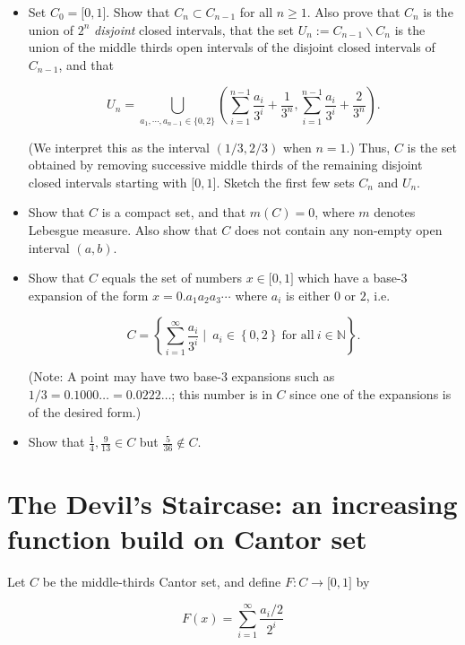 \documentclass{qlnotes-export}
\begin{document}
\begin{itemize}
\item
  Set \(C_{0} = \lbrack 0,1\rbrack\). Show that \(C_{n} \subset C_{n - 1}\) for all \(n \geq 1\). Also prove that \(C_{n}\) is the union of \(2^{n}\) \emph{disjoint} closed intervals, that the set \(U_{n} := C_{n - 1}\backslash C_{n}\) is the union of the middle thirds open intervals of the disjoint closed intervals of \(C_{n - 1}\), and that

  \[U_{n} = \bigcup\limits_{a_{1},\cdots,a_{n - 1} \in {\{{0,2}\}}}(\sum\limits_{i = 1}^{n - 1}\frac{a_{i}}{3^{i}} + \frac{1}{3^{n}},\sum\limits_{i = 1}^{n - 1}\frac{a_{i}}{3^{i}} + \frac{2}{3^{n}}).\]

  (We interpret this as the interval \((1/3,2/3)\) when \(n = 1\).) Thus, \(C\) is the set obtained by removing successive middle thirds of the remaining disjoint closed intervals starting with \(\lbrack 0,1\rbrack\). Sketch the first few sets \(C_{n}\) and \(U_{n}\).
\item
  Show that \(C\) is a compact set, and that \(m(C) = 0\), where \(m\) denotes Lebesgue measure. Also show that \(C\) does not contain any non-empty open interval \((a,b)\).
\item
  Show that \(C\) equals the set of numbers \(x \in \lbrack 0,1\rbrack\) which have a base-3 expansion of the form \(x = 0.a_{1}a_{2}a_{3}\cdots\) where \(a_{i}\) is either \(0\) or \(2\), i.e.~

  \[C = \left\{ {\sum\limits_{i = 1}^{\infty}\frac{a_{i}}{3^{i}} \mid \ a_{i} \in \left\{ {0,2} \right\}\ \text{for all}\ i \in {\mathbb{N}}} \right\}.\]

  (Note: A point may have two base-3 expansions such as \(1/3 = 0.1000\ldots = 0.0222\ldots\); this number is in \(C\) since one of the expansions is of the desired form.)
\item
  Show that \(\frac{1}{4},\frac{9}{13} \in C\) but \(\frac{5}{36} \notin C\).
\end{itemize}

\section{The Devil's Staircase: an increasing function build on Cantor set}\label{the-devils-staircase-an-increasing-function-build-on-cantor-set}

Let \(C\) be the middle-thirds Cantor set, and define \(F:C\rightarrow\lbrack 0,1\rbrack\) by

\[F(x) = \sum\limits_{i = 1}^{\infty}\frac{a_{i}/2}{2^{i}}\]
\end{document}
